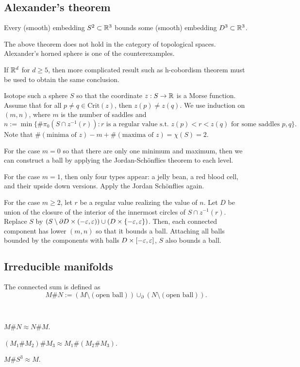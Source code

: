 \documentclass{../../../small}
\begin{document}
\subsection{Alexander's theorem}
\begin{thm}
Every (smooth) embedding $S^2\subset\mathbb{R}^3$ bounds some (smooth) embedding $D^3\subset\mathbb{R}^3$.
\end{thm}
\begin{rmk*}
The above theorem does not hold in the category of topological spaces.
Alexander's horned sphere is one of the counterexamples.

If $\mathbb{R}^d$ for $d\ge5$, then more complicated result such as h-cobordism theorem must be used to obtain the same conclusion.
\end{rmk*}
\begin{pf}[Sketch]
Isotope such a sphere $S$ so that the coordinate $z:S\to\mathbb{R}$ is a Morse function.
Assume that for all $p\ne q\in\mathrm{Crit}(z)$, then $z(p)\ne z(q)$.
We use induction on $(m,n)$, where $m$ is the number of saddles and
\[n:=\min\{\#\pi_0(S\cap z^{-1}(r)):\text{$r$ is a regular value s.t. $z(p)<r<z(q)$ for some saddles $p,q$}\}.\]
Note that $\#(\text{minima of $z$})-m+\#(\text{maxima of $z$})=\chi(S)=2$.

For the case $m=0$ so that there are only one minimum and maximum, then we can construct a ball by applying the Jordan-Sch\"onflies theorem to each level.

For the case $m=1$, then only four types appear: a jelly bean, a red blood cell, and their upside down versions.
Apply the Jordan Sch\"onflies again.

For the case $m\ge2$, let $r$ be a regular value realizing the value of $n$.
Let $D$ be union of the closure of the interior of the innermost circles of $S\cap z^{-1}(r)$.
Replace $S$ by $(S\setminus\pd D\times(-\e,\e))\cup(D\times\{-\e,\e\})$.
Then, each connected component has lower $(m,n)$ so that it bounds a ball.
Attaching all balls bounded by the components with balls $D\times[-\varepsilon,\varepsilon]$, $S$ also bounds a ball.
\end{pf}

\subsection{Irreducible manifolds}

The connected sum is defined as
\[M\# N:=(M\setminus(\text{open ball}))\cup_\partial(N\setminus(\text{open ball})).\]
\begin{prop}\,
\begin{parts}
\item $M\# N\approx N\# M$.
\item $(M_1\# M_2)\# M_3\approx M_1\#(M_2\# M_3)$.
\item $M\# S^3\approx M$.
\end{parts}
\end{prop}
\end{document}
